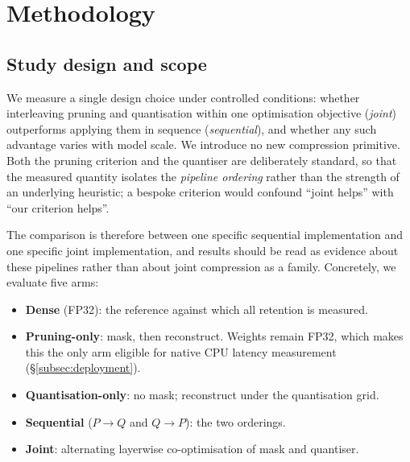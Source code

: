 %
%

\section{Methodology}
\label{sec:method}

\subsection{Study design and scope}
\label{subsec:scope}

We measure a single design choice under controlled conditions: whether interleaving
pruning and quantisation within one optimisation objective (\emph{joint}) outperforms
applying them in sequence (\emph{sequential}), and whether any such advantage varies with
model scale. We introduce no new compression primitive. Both the pruning criterion and the
quantiser are deliberately standard, so that the measured quantity isolates the
\emph{pipeline ordering} rather than the strength of an underlying heuristic; a bespoke
criterion would confound ``joint helps'' with ``our criterion helps''.

The comparison is therefore between one specific sequential implementation and one specific
joint implementation, and results should be read as evidence about these pipelines rather
than about joint compression as a family. Concretely, we evaluate five arms:

\begin{itemize}
  \item \textbf{Dense} (FP32): the reference against which all retention is measured.
  \item \textbf{Pruning-only}: mask, then reconstruct. Weights remain FP32, which makes this
        the only arm eligible for native CPU latency measurement (\S\ref{subsec:deployment}).
  \item \textbf{Quantisation-only}: no mask; reconstruct under the quantisation grid.
  \item \textbf{Sequential} ($P\!\rightarrow\!Q$ and $Q\!\rightarrow\!P$): the two orderings.
  \item \textbf{Joint}: alternating layerwise co-optimisation of mask and quantiser.
\end{itemize}

